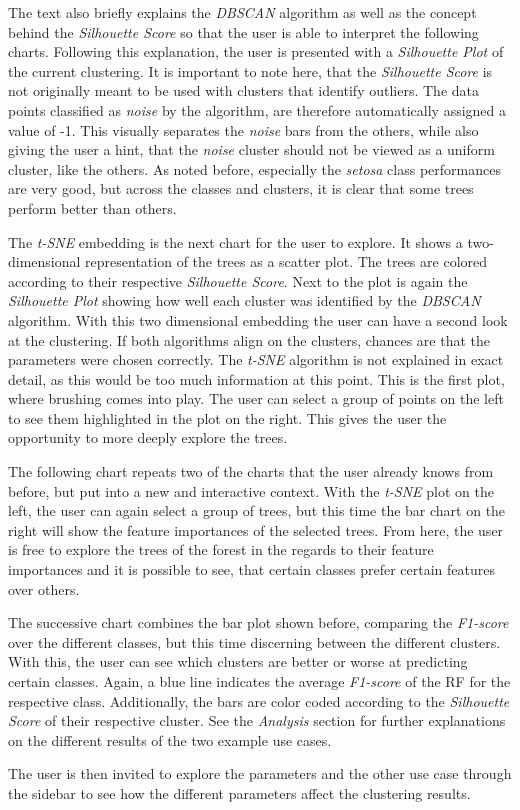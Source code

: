 \documentclass[a4paper, 12pt]{article}
\begin{document}
The text also briefly explains the \textit{DBSCAN} algorithm as well as the concept behind the
\textit{Silhouette Score} so that the user is able to interpret the following charts. Following this
explanation, the user is presented with a \textit{Silhouette Plot} of the current clustering.
It is important to note here, that the \textit{Silhouette Score} is not originally meant to be used
with clusters that identify outliers. The data points classified as \textit{noise} by the algorithm,
are therefore automatically assigned a value of -1. This visually separates the \textit{noise} bars
from the others, while also giving the user a hint, that the \textit{noise} cluster should not be
viewed as a uniform cluster, like the others.
As noted before, especially the \textit{setosa} class performances are very good, but across the
classes and clusters, it is clear that some trees perform better than others.
\par
The \textit{t-SNE} embedding is the next chart for the user to explore. It shows a two-dimensional
representation of the trees as a scatter plot. The trees are colored according to their respective
\textit{Silhouette Score}. Next to the plot is again the \textit{Silhouette Plot} showing how well each
cluster was identified by the \textit{DBSCAN} algorithm. With this two dimensional embedding the user
can have a second look at the clustering. If both algorithms align
on the clusters, chances are that the parameters were chosen correctly. The \textit{t-SNE} algorithm
is not explained in exact detail, as this would be too much information at this point.
This is the first plot, where brushing comes into play. The user can select a group of points on the
left to see them highlighted in the plot on the right. This gives the user the opportunity to more
deeply explore the trees. \par
The following chart repeats two of the charts that the user already knows from before, but put into a new
and interactive context. With the \textit{t-SNE} plot on the left, the user can again select a group
of trees, but this time the bar chart on the right will show the feature importances of the selected
trees. From here, the user is free to explore the trees of the forest in the regards to their
feature importances and it is possible to see, that certain classes prefer certain features over
others. \par
The successive chart combines the bar plot shown before, comparing the \textit{F1-score} over the
different classes, but this time discerning between the different clusters. With this, the user can
see which clusters are better or worse at predicting certain classes. Again, a blue line indicates
the average \textit{F1-score} of the RF for the respective class. Additionally, the bars are color
coded according to the \textit{Silhouette Score} of their respective cluster. See the \textit{Analysis}
section for further explanations on the different results of the two example use cases. \par
The user is then invited to explore the parameters and the other use case through the sidebar to see
how the different parameters affect the clustering results.
\end{document}
